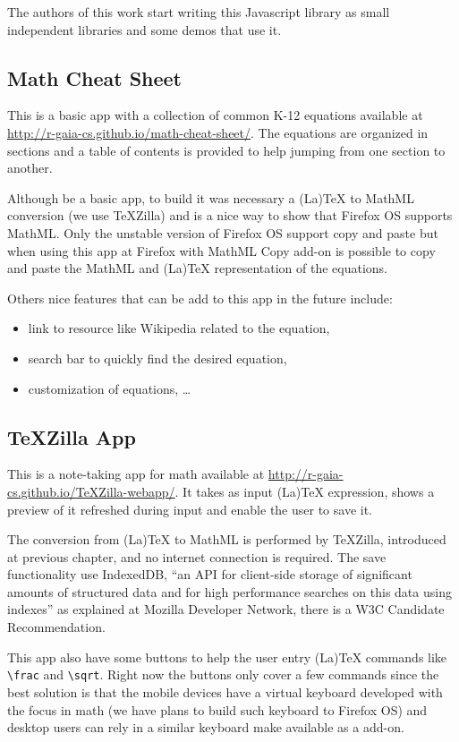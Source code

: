 The authors of this work start writing this Javascript library as small
independent libraries and some demos that use it.

\subsection{Math Cheat Sheet}

This is a basic app with a collection of common K-12 equations available at
\href{http://r-gaia-cs.github.io/math-cheat-sheet/}{http://r-gaia-cs.github.io/math-cheat-sheet/}.
The equations are organized in sections and a table of contents is provided to
help jumping from one section to another.

Although be a basic app, to build it was necessary a (La)TeX to MathML
conversion (we use TeXZilla) and is a nice way to show that Firefox OS supports
MathML. Only the unstable version of Firefox OS support copy and paste but when
using this app at Firefox with MathML Copy add-on is possible to
copy and paste the MathML and (La)TeX representation of the equations.

Others nice features that can be add to this app in the
future include:
\begin{itemize}
  \item link to resource like Wikipedia related to the equation,
  \item search bar to quickly find the desired equation,
  \item customization of equations, \ldots
\end{itemize}

\subsection{TeXZilla App}

This is a note-taking app for math available at
\href{http://r-gaia-cs.github.io/TeXZilla-webapp/}{http://r-gaia-cs.github.io/TeXZilla-webapp/}.
It takes as input (La)TeX expression, shows a preview of it refreshed during
input and enable the user to save it.

The conversion from (La)TeX to MathML is performed by TeXZilla, introduced at
previous chapter, and no internet connection is required. The save functionality
use IndexedDB, ``an API for client-side storage of significant amounts of
structured data and for high performance searches on this data using indexes''
as explained at Mozilla Developer Network, there is a W3C Candidate
Recommendation.

This app also have some buttons to help the user entry (La)TeX commands like
{\tt \textbackslash frac} and {\tt \textbackslash sqrt}. Right now the buttons
only cover a few commands since the best solution is that the mobile devices
have a virtual keyboard developed with the focus in math (we have plans to build
such keyboard to Firefox OS) and desktop users can rely in a similar keyboard
make available as a add-on.
